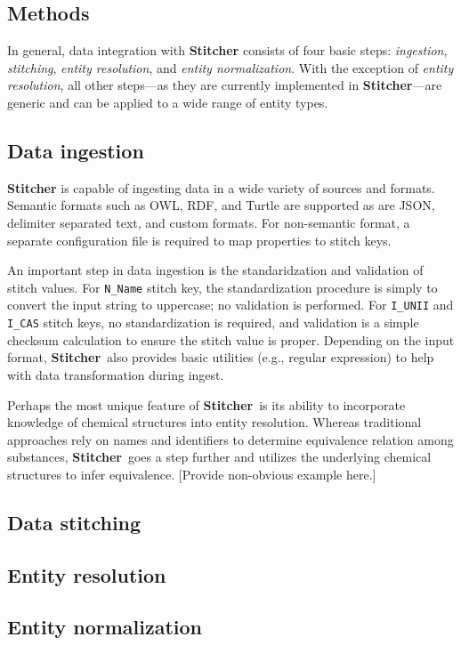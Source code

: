 \documentclass{bioinfo}
\newcommand\st{\textbf{Stitcher}}
\begin{document}
\begin{methods}
\section{Methods}\label{sec:methods}
In general, data integration with \st{} consists of four basic steps: \emph{ingestion}, \emph{stitching}, \emph{entity resolution}, and \emph{entity normalization}. With the exception of \emph{entity resolution}, all other steps---as they are currently implemented in \st---are generic and can be applied to a wide range of entity types.

\subsection{Data ingestion}\label{sec:methods-ingest}
\st{} is capable of ingesting data in a wide variety of sources and formats. Semantic formats such as OWL, RDF, and Turtle are supported as are JSON, delimiter separated text, and custom formats. For non-semantic format, a separate configuration file is required to map properties to stitch keys.

An important step in data ingestion is the standaridzation and validation of stitch values. For \texttt{N\_Name} stitch key, the standardization procedure is simply to convert the input string to uppercase; no validation is performed. For \texttt{I\_UNII} and \texttt{I\_CAS} stitch keys, no standardization is required, and validation is a simple checksum calculation to ensure the stitch value is proper. Depending on the input format, \st\ also provides basic utilities (e.g., regular expression) to help with data transformation during ingest.

Perhaps the most unique feature of \st\ is its ability to incorporate knowledge of chemical structures into entity resolution. Whereas traditional approaches rely on names and identifiers to determine equivalence relation among substances, \st\ goes a step further and utilizes the underlying chemical structures to infer equivalence. [Provide non-obvious example here.]

\subsection{Data stitching}

\subsection{Entity resolution}\label{sec:methods-er}

\subsection{Entity normalization}

\end{methods}
\end{document}
